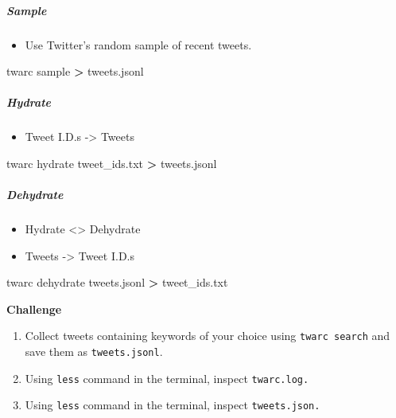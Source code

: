 \documentclass[
]{book}
\newenvironment{Shaded}{\begin{snugshade}}{\end{snugshade}}
\newcommand{\ExtensionTok}[1]{#1}
\newcommand{\NormalTok}[1]{#1}
\newcommand{\OperatorTok}[1]{\textcolor[rgb]{0.81,0.36,0.00}{\textbf{#1}}}
\providecommand{\tightlist}{%
  \setlength{\itemsep}{0pt}\setlength{\parskip}{0pt}}
\begin{document}
\hypertarget{sample}{%
\subparagraph{Sample}\label{sample}}

\begin{itemize}
\tightlist
\item
  Use Twitter's random sample of recent tweets.
\end{itemize}

\begin{Shaded}
\begin{Highlighting}[]
\ExtensionTok{twarc}\NormalTok{ sample }\OperatorTok{\textgreater{}}\NormalTok{ tweets.jsonl }
\end{Highlighting}
\end{Shaded}

\hypertarget{hydrate}{%
\subparagraph{Hydrate}\label{hydrate}}

\begin{itemize}
\tightlist
\item
  Tweet I.D.s -\textgreater{} Tweets
\end{itemize}

\begin{Shaded}
\begin{Highlighting}[]
\ExtensionTok{twarc}\NormalTok{ hydrate tweet\_ids.txt }\OperatorTok{\textgreater{}}\NormalTok{ tweets.jsonl }
\end{Highlighting}
\end{Shaded}

\hypertarget{dehydrate}{%
\subparagraph{Dehydrate}\label{dehydrate}}

\begin{itemize}
\tightlist
\item
  Hydrate \textless\textgreater{} Dehydrate
\item
  Tweets -\textgreater{} Tweet I.D.s
\end{itemize}

\begin{Shaded}
\begin{Highlighting}[]
\ExtensionTok{twarc}\NormalTok{ dehydrate tweets.jsonl }\OperatorTok{\textgreater{}}\NormalTok{ tweet\_ids.txt}
\end{Highlighting}
\end{Shaded}

\textbf{Challenge}

\begin{enumerate}
\def\labelenumi{\arabic{enumi}.}
\item
  Collect tweets containing keywords of your choice using \texttt{twarc\ search} and save them as \texttt{tweets.jsonl}.
\item
  Using \texttt{less} command in the terminal, inspect \texttt{twarc.log.}
\item
  Using \texttt{less} command in the terminal, inspect \texttt{tweets.json.}
\end{enumerate}
\end{document}
